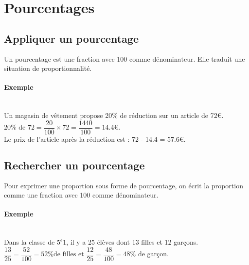 \documentclass[paper=a4, fontsize=9pt]{scrartcl} %
\begin{document}
\section{Pourcentages}
\begin{multicols}{2}
  \subsection{Appliquer un pourcentage}

  \begin{Definition}
    Un pourcentage est une fraction avec 100 comme dénominateur. Elle traduit une situation de proportionnalité.
  \end{Definition}

  \paragraph{Exemple}~~\\
  Un magasin de vêtement propose 20\% de réduction sur un article de 72\euro.\\
  $20\% \text{ de } 72 = \dfrac{20}{100} \times 72 = \dfrac{1440}{100} = 14.4$\euro.\\
  Le prix de l'article après la réduction est : 72 - 14.4 = 57.6\euro.

  \subsection{Rechercher un pourcentage}

  \begin{Definition}
    Pour exprimer une proportion sous forme de pourcentage, on écrit la proportion comme une fraction avec 100 comme dénominateur.
  \end{Definition}

  \paragraph{Exemple}~~\\
  Dans la classe de $5^{e}1$, il y a 25 élèves dont 13 filles et 12 garçons.\\
  $\dfrac{13}{25} = \dfrac{52}{100} = 52 \text{\% de filles et } \dfrac{12}{25} = \dfrac{48}{100} = 48$\% de garçon.
\end{multicols}
\end{document}
